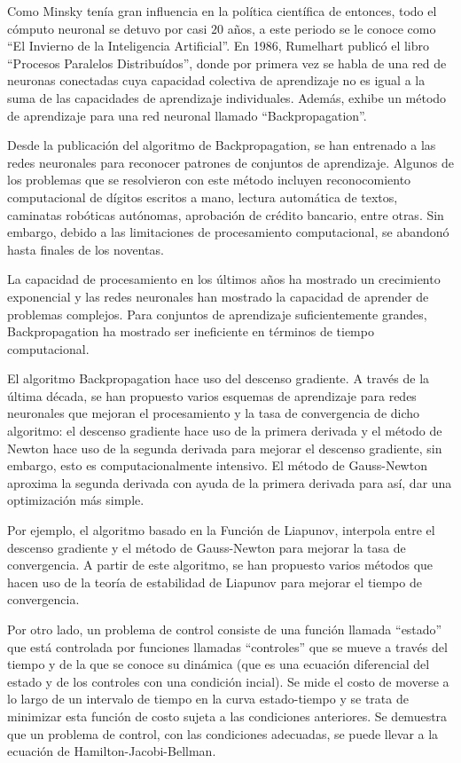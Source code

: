 \documentclass[11pt,letterpaper]{article}
\theoremstyle{definition}
\theoremstyle{definition}
\theoremstyle{definition}
\theoremstyle{definition}
\theoremstyle{definition}
\theoremstyle{definition}
\theoremstyle{definition}
\theoremstyle{definition}
\begin{document}
Como Minsky tenía gran influencia en la política científica de entonces, todo el cómputo neuronal se detuvo por casi $ 20 $ años, a este periodo se le conoce como ``El Invierno de la Inteligencia Artificial''. En 1986, Rumelhart publicó el libro  ``Procesos Paralelos Distribuídos'', donde por primera vez se habla de una red de neuronas conectadas cuya capacidad colectiva de aprendizaje no es igual a la suma de las capacidades de aprendizaje individuales. Además, exhibe un método de aprendizaje para una red neuronal llamado ``Backpropagation''.

Desde la publicación del algoritmo de Backpropagation, se han  entrenado a las redes neuronales para reconocer patrones de conjuntos de aprendizaje. Algunos de los problemas que se resolvieron con este método incluyen reconocomiento computacional de dígitos escritos a mano, lectura automática de textos, caminatas robóticas autónomas, aprobación de crédito bancario, entre otras. Sin embargo, debido a las limitaciones de procesamiento computacional, se abandonó hasta finales de los noventas.

La capacidad de procesamiento en los últimos años ha mostrado un crecimiento exponencial y las redes neuronales han mostrado la capacidad de aprender de problemas complejos. Para conjuntos de aprendizaje suficientemente grandes, Backpropagation ha mostrado ser ineficiente en términos de tiempo computacional. 

El algoritmo Backpropagation hace uso del descenso gradiente. A través de la última década, se han propuesto varios esquemas de aprendizaje para redes neuronales que mejoran el procesamiento y la tasa de convergencia de dicho algoritmo: el descenso gradiente hace uso de la primera derivada y el método de Newton hace uso de la segunda derivada para mejorar el descenso gradiente, sin embargo, esto es computacionalmente intensivo. El método de Gauss-Newton aproxima la segunda derivada con ayuda de la primera derivada para así, dar una optimización más simple. 

Por ejemplo, el algoritmo basado en la Función de Liapunov, interpola entre el descenso gradiente y el método de Gauss-Newton para mejorar la tasa de convergencia. A partir de este algoritmo, se han propuesto varios métodos que hacen uso de la teoría de estabilidad de Liapunov para mejorar el tiempo de convergencia.

Por otro lado, un problema de control consiste de una función llamada ``estado'' que está controlada por funciones llamadas ``controles'' que se mueve a través del tiempo y de la que se conoce su dinámica (que es una ecuación diferencial del estado y de los controles con una condición incial). Se mide el costo de moverse a lo largo de un intervalo de tiempo en la curva estado-tiempo y se trata de minimizar esta función de costo sujeta a las condiciones anteriores. Se demuestra que un problema de control, con las condiciones adecuadas, se puede llevar a la ecuación de Hamilton-Jacobi-Bellman. 
\end{document}

